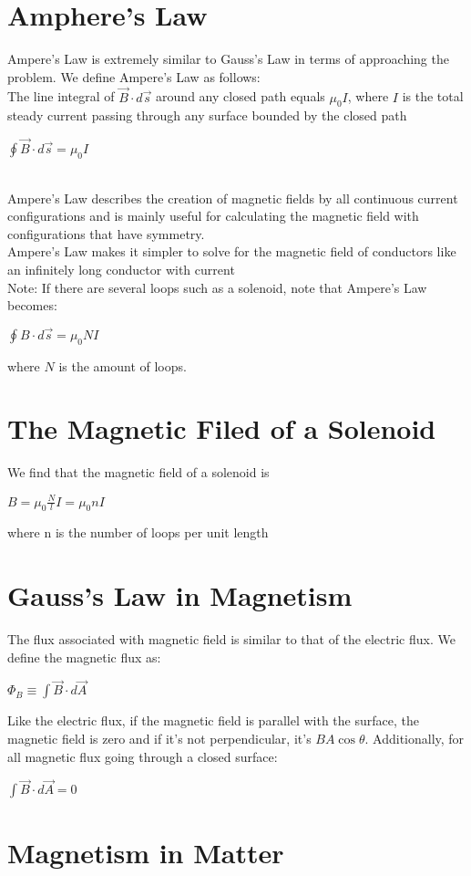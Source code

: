 \documentclass{report}
\begin{document}
	\section{Amphere's Law}
		Ampere's Law is extremely similar to Gauss's Law in terms of approaching the problem. We define Ampere's Law as follows:\\
		The line integral of $\vec{B} \cdot d\vec{s}$ around any closed path equals $\mu_0I$, where $I$ is the total steady current passing through any surface bounded by the closed path\\
		\centerline{$\oint \vec{B} \cdot d\vec{s} = \mu_0 I$}
		\\
		Ampere's Law describes the creation of magnetic fields by all continuous current configurations and is mainly useful for calculating the magnetic field with configurations that have symmetry.\\
		Ampere's Law makes it simpler to solve for the magnetic field of conductors like an infinitely long conductor with current\\
		Note: If there are several loops such as a solenoid, note that Ampere's Law becomes:\\
		\centerline{$\oint B \cdot d\vec{s} = \mu_0NI$}
		where $N$ is the amount of loops.
	\section{The Magnetic Filed of a Solenoid}
		We find that the magnetic field of a solenoid is \\
		\centerline{$B = \mu_0 \frac{N}{l}I = \mu_0 nI$}
		where n is the number of loops per unit length
	\section{Gauss's Law in Magnetism}
		The flux associated with magnetic field is similar to that of the electric flux. We define the magnetic flux as:\\
		\centerline{$\Phi_B \equiv \int \vec{B} \cdot d\vec{A}$}
		Like the electric flux, if the magnetic field is parallel with the surface, the magnetic field is zero and if it's not perpendicular, it's $BA\cos \theta$. Additionally, for all magnetic flux going through a closed surface:\\
		\centerline{$\int \vec{B} \cdot d\vec{A} = 0$}
	\section{Magnetism in Matter}
\end{document}
